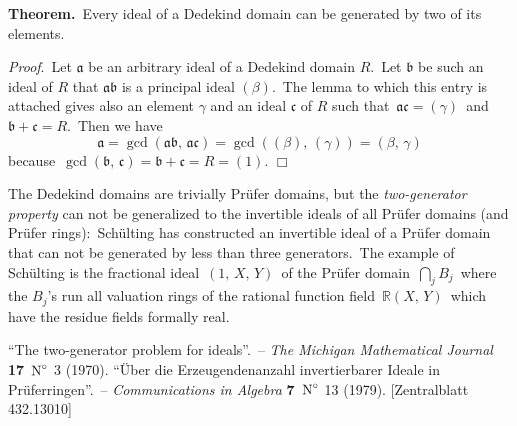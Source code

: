 \documentclass[12pt]{article}
\theoremstyle{definition}
\begin{document}
\textbf{Theorem.}\, Every ideal of a Dedekind domain can be generated by two of its elements.

 
{\em Proof}.\, Let $\mathfrak{a}$ be an arbitrary ideal of a Dedekind domain $R$.\, Let $\mathfrak{b}$ be such an ideal of $R$ that $\mathfrak{ab}$ is a principal ideal $(\beta)$.\, The lemma to which this entry is attached gives also an element $\gamma$ and an ideal $\mathfrak{c}$ of $R$ such that\, $\mathfrak{ac} = (\gamma)$\, and\, $\mathfrak{b+c} = R$.\, Then we have
      $$\mathfrak{a} = \gcd(\mathfrak{ab},\,\mathfrak{ac}) = 
        \gcd((\beta),\,(\gamma)) = (\beta,\,\gamma)$$
because\, $\gcd(\mathfrak{b},\,\mathfrak{c}) = \mathfrak{b+c} = R = (1)$. $\Box$

The Dedekind domains are trivially Pr\"ufer domains, but the {\em two-generator property} can not be generalized to the invertible ideals of all Pr\"ufer domains (and Pr\"ufer rings):\, Sch\"ulting has constructed an invertible ideal of a Pr\"ufer domain that can not be generated by less than three generators.\, The example of Sch\"ulting is the fractional ideal\, $(1,\,X,\,Y)$\, of the Pr\"ufer domain\, $\bigcap_j B_j$\, where the $B_j$'s run all valuation rings of the rational function field\, $\mathbb{R}(X,\,Y)$\, which have the residue fields formally real.

\begin{thebibliography}{9}
 ``{The two-generator problem for ideals}''. \,-- {\em The Michigan Mathematical Journal} \textbf{17}\, $\mbox{N}\sp\circ$ 3 (1970).
 ``{\"Uber die Erzeugendenanzahl invertierbarer Ideale in Pr\"uferringen}''. \,-- {\em Communications in Algebra} \textbf{7}\, $\mbox{N}\sp\circ$ 13 (1979). [Zentralblatt 432.13010]
\end{thebibliography}
\end{document}
